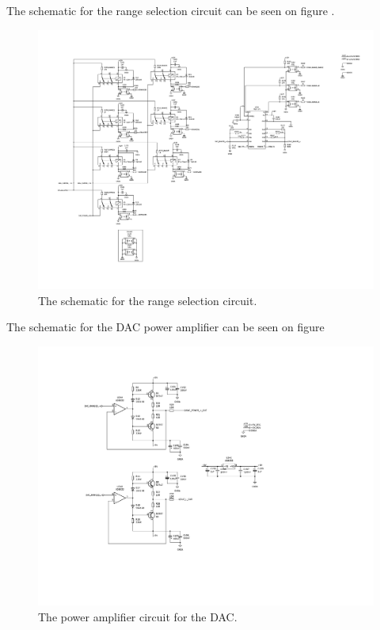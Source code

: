 The schematic for the range selection circuit can be seen on figure .

\begin{figure}[H]
    \centering
    \includegraphics[clip, trim=0 25 0 0, width=1\textwidth]{Appendix/Figures/A_SCH_RANGE}
    \caption{The schematic for the range selection circuit.}
    \label{fig_A_SCH_RANGE}
\end{figure}

The schematic for the DAC power amplifier can be seen on figure 
\begin{figure}[H]
    \centering
    \includegraphics[clip, trim=0 100 0 0, width=1\textwidth]{Appendix/Figures/A_SCH_DACPA}
    \caption{The power amplifier circuit for the DAC.}
    \label{fig_A_SCH_DACPA}
\end{figure}